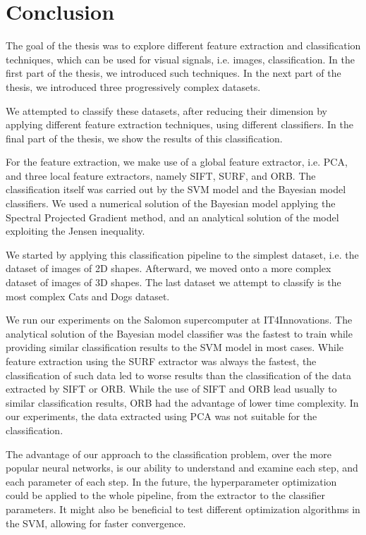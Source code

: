 \chapter{Conclusion}
The goal of the thesis was to explore different feature extraction and classification techniques, which can be used for visual signals, i.e. images, classification. In the first part of the thesis, we introduced such techniques. In the next part of the thesis, we introduced three progressively complex datasets.

We attempted to classify these datasets, after reducing their dimension by applying different feature extraction techniques, using different classifiers. In the final part of the thesis, we show the results of this classification.

For the feature extraction, we make use of a global feature extractor, i.e. PCA, and three local feature extractors, namely SIFT, SURF, and ORB. The classification itself was carried out by the SVM model and the Bayesian model classifiers. We used a numerical solution of the Bayesian model applying the Spectral Projected Gradient method, and an analytical solution of the model exploiting the Jensen inequality.

We started by applying this classification pipeline to the simplest dataset, i.e. the dataset of images of 2D shapes. Afterward, we moved onto a more complex dataset of images of 3D shapes. The last dataset we attempt to classify is the most complex Cats and Dogs dataset.

We run our experiments on the Salomon supercomputer at IT4Innovations. The analytical solution of the Bayesian model classifier was the fastest to train while providing similar classification results to the SVM model in most cases. While feature extraction using the SURF extractor was always the fastest, the classification of such data led to worse results than the classification of the data extracted by SIFT or ORB. While the use of SIFT and ORB lead usually to similar classification results, ORB had the advantage of lower time complexity. In our experiments, the data extracted using PCA was not suitable for the classification.

The advantage of our approach to the classification problem, over the more popular neural networks, is our ability to understand and examine each step, and each parameter of each step. In the future, the hyperparameter optimization could be applied to the whole pipeline, from the extractor to the classifier parameters. It might also be beneficial to test different optimization algorithms in the SVM, allowing for faster convergence.
